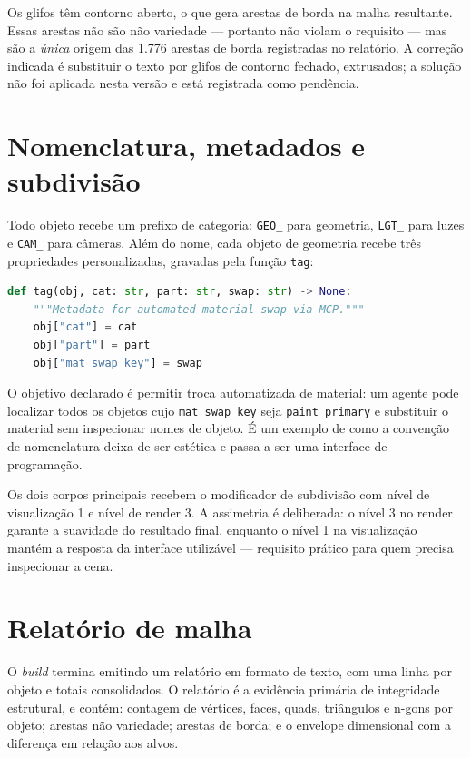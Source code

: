 Os glifos t\^em contorno aberto, o que gera arestas de borda na malha resultante. Essas arestas
n\~ao s\~ao n\~ao variedade --- portanto n\~ao violam o requisito --- mas s\~ao a
\emph{\'unica} origem das 1.776 arestas de borda registradas no relat\'orio. A
corre{\c{c}}\~ao indicada \'e substituir o texto por glifos de contorno fechado, extrusados; a
solu{\c{c}}\~ao n\~ao foi aplicada nesta vers\~ao e est\'a registrada como pend\^encia.

\section{Nomenclatura, metadados e subdivis\~ao}\label{sec:nomenclatura}

Todo objeto recebe um prefixo de categoria: \texttt{GEO\_} para geometria, \texttt{LGT\_} para
luzes e \texttt{CAM\_} para c\^ameras. Al\'em do nome, cada objeto de geometria recebe tr\^es
propriedades personalizadas, gravadas pela fun{\c{c}}\~ao \texttt{tag}:

\begin{lstlisting}[language=Python]
def tag(obj, cat: str, part: str, swap: str) -> None:
    """Metadata for automated material swap via MCP."""
    obj["cat"] = cat
    obj["part"] = part
    obj["mat_swap_key"] = swap
\end{lstlisting}

O objetivo declarado \'e permitir troca automatizada de material: um agente pode localizar
todos os objetos cujo \texttt{mat\_swap\_key} seja \texttt{paint\_primary} e substituir o
material sem inspecionar nomes de objeto. \'E um exemplo de como a conven{\c{c}}\~ao de
nomenclatura deixa de ser est\'etica e passa a ser uma interface de programa{\c{c}}\~ao.

Os dois corpos principais recebem o modificador de subdivis\~ao com n\'ivel de
visualiza{\c{c}}\~ao 1 e n\'ivel de render 3. A assimetria \'e deliberada: o n\'ivel 3 no
render garante a suavidade do resultado final, enquanto o n\'ivel 1 na
visualiza{\c{c}}\~ao mant\'em a resposta da interface utiliz\'avel --- requisito pr\'atico
para quem precisa inspecionar a cena.

\section{Relat\'orio de malha}\label{sec:relatorio-malha}

O \emph{build} termina emitindo um relat\'orio em formato de texto, com uma linha por objeto e
totais consolidados. O relat\'orio \'e a evid\^encia prim\'aria de integridade estrutural, e
cont\'em: contagem de v\'ertices, faces, quads, tri\^angulos e n-gons por objeto; arestas
n\~ao variedade; arestas de borda; e o envelope dimensional com a diferen{\c{c}}a em
rela{\c{c}}\~ao aos alvos.

